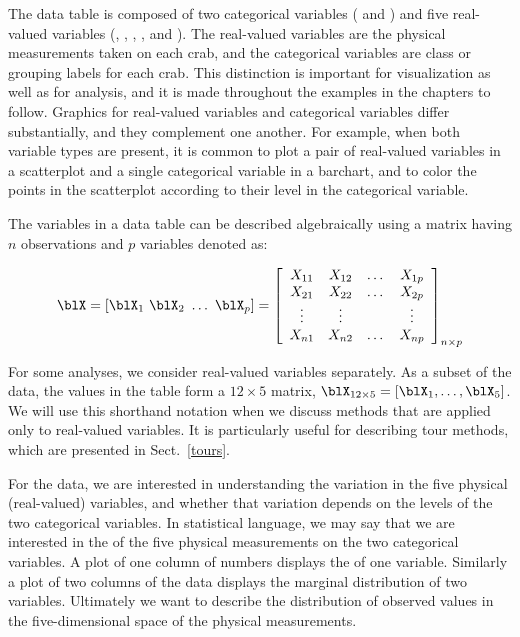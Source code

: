 The data table is composed of two categorical variables (
and ) and five real-valued variables (,
, , , and
). The real-valued variables are the physical
measurements taken on each crab, and the categorical variables are
class or grouping labels for each crab.  This distinction is important
for visualization as well as for analysis, and it is made throughout
the examples in the chapters to follow.    Graphics for
real-valued variables and categorical variables differ substantially,
and they complement one another.  For example, when both variable
types are present, it is common to plot a pair of real-valued
variables in a scatterplot and a single categorical variable in a
barchart, and to color the points in the scatterplot according to
their level in the categorical variable.

The 
variables in a data table can be described algebraically using a
matrix having $n$ observations and $p$ variables denoted as:

\begin{eqnarray*}
\blX =
[\blX_1~\blX_2~\dots~\blX_p] = \left[ \begin{array}{cccc}
X_{11} & X_{12} & \dots & X_{1p} \\
X_{21} & X_{22} & \dots & X_{2p}\\
\vdots & \vdots &  & \vdots \\
X_{n1} & X_{n2} & \dots & X_{np} \end{array} \right]_{n\times p}
\end{eqnarray*}

\noindent For some analyses, we consider real-valued variables
separately.  As a subset of the  data, the values in the
table form a $12 \times 5$ matrix, $\blX_{12\times 5} = \left[ \blX_1,
\dots, \blX_5 \right]$.  We will use this shorthand notation when we
discuss methods that are applied only to real-valued variables. It is
particularly useful for describing tour  methods,
which are presented in Sect.~\ref{tours}.

For the  data, we are interested in understanding the
variation in the five physical (real-valued) variables, and whether
that variation depends on the levels of the two categorical
variables. In statistical language, we may say that we are interested
in the  of the five physical measurements
 on the two categorical variables. A plot of one
column of numbers displays the  of one
variable. Similarly a plot of two columns of the data displays the
marginal distribution of two variables. Ultimately we want to describe
the distribution of observed values in the five-dimensional space of
the physical measurements.


